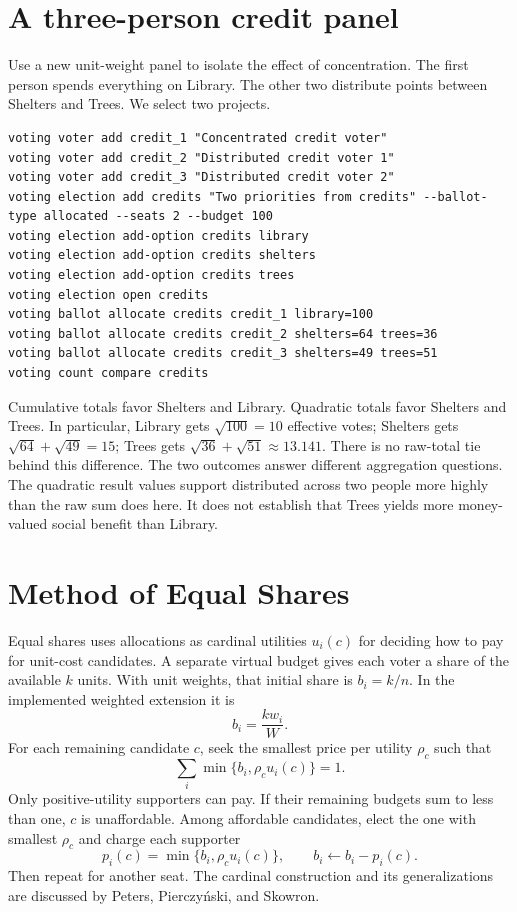 \section{A three-person credit panel}
Use a new unit-weight panel to isolate the effect of concentration. The first person spends everything on Library. The other two distribute points between Shelters and Trees. We select two projects.
\begin{lstlisting}[style=votingrun]
voting voter add credit_1 "Concentrated credit voter"
voting voter add credit_2 "Distributed credit voter 1"
voting voter add credit_3 "Distributed credit voter 2"
voting election add credits "Two priorities from credits" --ballot-type allocated --seats 2 --budget 100
voting election add-option credits library
voting election add-option credits shelters
voting election add-option credits trees
voting election open credits
voting ballot allocate credits credit_1 library=100
voting ballot allocate credits credit_2 shelters=64 trees=36
voting ballot allocate credits credit_3 shelters=49 trees=51
voting count compare credits
\end{lstlisting}
Cumulative totals favor Shelters and Library. Quadratic totals favor Shelters and Trees. In particular, Library gets $\sqrt{100}=10$ effective votes; Shelters gets $\sqrt{64}+\sqrt{49}=15$; Trees gets $\sqrt{36}+\sqrt{51}\approx13.141$. There is no raw-total tie behind this difference.
The two outcomes answer different aggregation questions. The quadratic result values support distributed across two people more highly than the raw sum does here. It does not establish that Trees yields more money-valued social benefit than Library.

\section{Method of Equal Shares}
Equal shares uses allocations as cardinal utilities $u_i(c)$ for deciding how to pay for unit-cost candidates. A separate virtual budget gives each voter a share of the available $k$ units. With unit weights, that initial share is $b_i=k/n$. In the implemented weighted extension it is
\[
b_i=\frac{k w_i}{W}.
\]
For each remaining candidate $c$, seek the smallest price per utility $\rho_c$ such that
\[
\sum_i\min\{b_i,\rho_c u_i(c)\}=1.
\]
Only positive-utility supporters can pay. If their remaining budgets sum to less than one, $c$ is unaffordable. Among affordable candidates, elect the one with smallest $\rho_c$ and charge each supporter
\[
p_i(c)=\min\{b_i,\rho_c u_i(c)\},\qquad
b_i\leftarrow b_i-p_i(c).
\]
Then repeat for another seat. The cardinal construction and its generalizations are discussed by Peters, Pierczy\'nski, and Skowron.\cite{equalshares}

